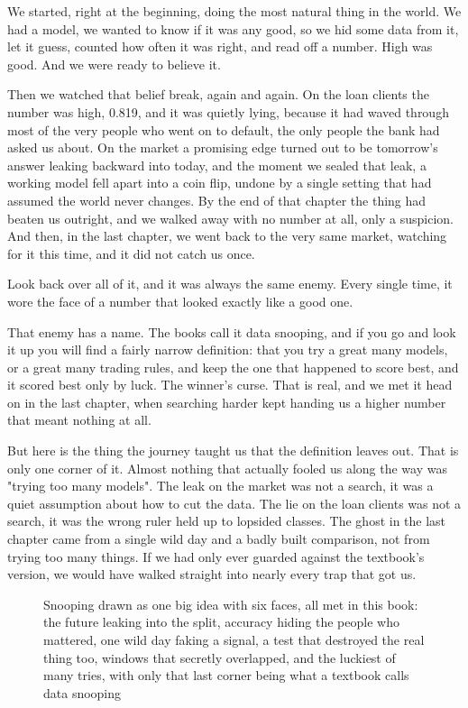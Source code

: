 \documentclass[11pt]{article} %
\begin{document}
We started, right at the beginning, doing the most natural thing in the world. We had a model, we wanted to know if it was any good, so we hid some data from it, let it guess, counted how often it was right, and read off a number. High was good. And we were ready to believe it.

Then we watched that belief break, again and again. On the loan clients the number was high, 0.819, and it was quietly lying, because it had waved through most of the very people who went on to default, the only people the bank had asked us about. On the market a promising edge turned out to be tomorrow's answer leaking backward into today, and the moment we sealed that leak, a working model fell apart into a coin flip, undone by a single setting that had assumed the world never changes. By the end of that chapter the thing had beaten us outright, and we walked away with no number at all, only a suspicion. And then, in the last chapter, we went back to the very same market, watching for it this time, and it did not catch us once.

Look back over all of it, and it was always the same enemy. Every single time, it wore the face of a number that looked exactly like a good one.

That enemy has a name. The books call it data snooping, and if you go and look it up you will find a fairly narrow definition: that you try a great many models, or a great many trading rules, and keep the one that happened to score best, and it scored best only by luck. The winner's curse. That is real, and we met it head on in the last chapter, when searching harder kept handing us a higher number that meant nothing at all.

But here is the thing the journey taught us that the definition leaves out. That is only one corner of it. Almost nothing that actually fooled us along the way was "trying too many models". The leak on the market was not a search, it was a quiet assumption about how to cut the data. The lie on the loan clients was not a search, it was the wrong ruler held up to lopsided classes. The ghost in the last chapter came from a single wild day and a badly built comparison, not from trying too many things. If we had only ever guarded against the textbook's version, we would have walked straight into nearly every trap that got us.

\begin{figure}[htbp]
\centering

\caption{Snooping drawn as one big idea with six faces, all met in this book: the future leaking into the split, accuracy hiding the people who mattered, one wild day faking a signal, a test that destroyed the real thing too, windows that secretly overlapped, and the luckiest of many tries, with only that last corner being what a textbook calls data snooping}
\end{figure}
\end{document}

